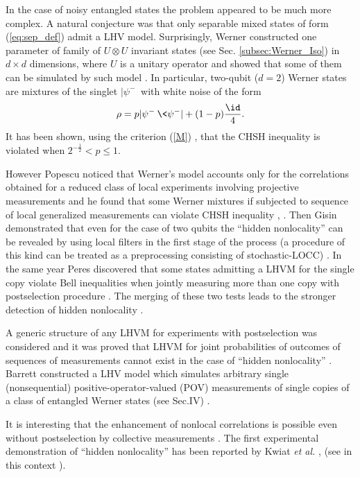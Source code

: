 \documentclass[twocolumn,aps,rmp]{revtex4}
\begin{document}
In the case of noisy entangled states the problem appeared to be much
more complex. A natural conjecture was that only separable mixed
states of form (\ref{eq:sep_def}) admit a LHV model. Surprisingly, Werner
constructed one parameter of family of $U \otimes U$ invariant states
(see Sec. \ref{subsec:Werner_Iso}) in $d \times d$ dimensions, where
$U$ is a unitary operator and showed that some of them can be
simulated by such model \cite {Werner1989}. In particular, two-qubit
($d=2$) Werner states are mixtures of the singlet $|\psi^-\>$ with
white noise of the form
\begin{equation}
\rho = p|\psi^-\>\<\psi^-|+ (1-p)\frac{\id}{4}.
\label {W}
\end{equation}
It has been shown, using the criterion (\ref{M}) \cite {HHH1995-bell},
that the CHSH inequality is violated when ${2^{-\frac{1}{2}} } {<p\leq
  1}$.

However Popescu noticed that Werner's model accounts only for the
correlations obtained for a reduced class of local experiments
involving projective measurements and he found that some Werner
mixtures if subjected to sequence of local generalized measurements
can violate CHSH inequality , \cite {Popescu2}. Then Gisin
demonstrated that even for the case of two qubits the ``hidden
nonlocality'' can be revealed by using local filters in the first
stage of the process (a procedure of this kind can be treated as a
preprocessing consisting of stochastic-LOCC) \cite {Gisin96}. In the
same year Peres discovered that some states admitting a LHVM for the
single copy violate Bell inequalities when jointly measuring more than
one copy with postselection procedure \cite {Peres96}.  The merging of
these two tests leads to the stronger detection of hidden nonlocality
\cite {Masanes}.

A generic structure of any LHVM for experiments with postselection was
considered and it was proved that LHVM for joint probabilities of
outcomes of sequences of measurements cannot exist in the case of
``hidden nonlocality'' \cite {Popescu2,ZH,Teufel}. Barrett constructed a LHV model
which simulates arbitrary single (nonsequential) positive-operator-valued (POV) measurements of single copies of a class of entangled Werner states (see Sec.IV) \cite {Barrett2002}.


It is interesting
that the enhancement of nonlocal correlations is possible even without
postselection by collective measurements \cite {Doherty}. The first
experimental demonstration of ``hidden nonlocality'' has been reported
by Kwiat \emph{et al.} \cite {Kwiat}, (see in this context \cite {Z}).
\end{document}
